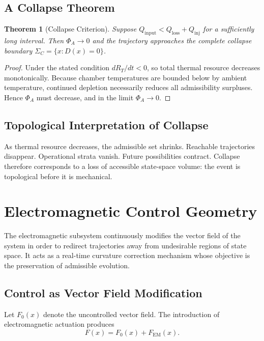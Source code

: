 \documentclass[12pt,a4paper]{article}
\newtheorem{theorem}{Theorem}[section]
\begin{document}
\subsection{A Collapse Theorem}

\begin{theorem}[Collapse Criterion]
Suppose $Q_{\mathrm{input}} < Q_{\mathrm{loss}} + Q_{\mathrm{inj}}$ for a sufficiently long interval. Then $\Phi_A \to 0$ and the trajectory approaches the complete collapse boundary $\Sigma_C = \{ x : D(x) = 0 \}$.
\end{theorem}

\begin{proof}
Under the stated condition $dR_T/dt < 0$, so total thermal resource decreases monotonically. Because chamber temperatures are bounded below by ambient temperature, continued depletion necessarily reduces all admissibility surpluses. Hence $\Phi_A$ must decrease, and in the limit $\Phi_A \to 0$.
\end{proof}

\subsection{Topological Interpretation of Collapse}

As thermal resource decreases, the admissible set shrinks. Reachable trajectories disappear. Operational strata vanish. Future possibilities contract. Collapse therefore corresponds to a loss of accessible state-space volume: the event is topological before it is mechanical.

\section{Electromagnetic Control Geometry}

The electromagnetic subsystem continuously modifies the vector field of the system in order to redirect trajectories away from undesirable regions of state space. It acts as a real-time curvature correction mechanism whose objective is the preservation of admissible evolution.

\subsection{Control as Vector Field Modification}

Let $F_0(x)$ denote the uncontrolled vector field. The introduction of electromagnetic actuation produces
\[
F(x) = F_0(x) + F_{\mathrm{EM}}(x).
\]
\end{document}
